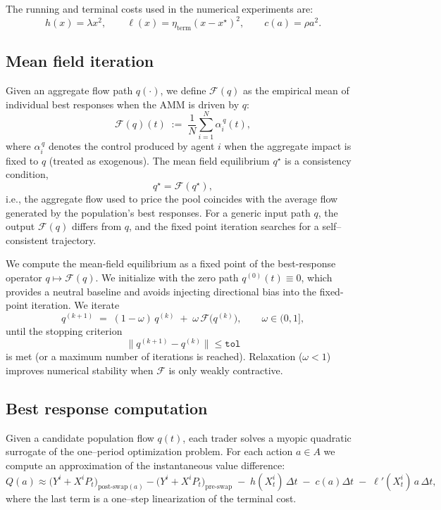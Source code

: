 \documentclass[11pt]{article}
\theoremstyle{definition}
\begin{document}
The running and terminal costs used in the numerical experiments are:
\[
h(x) = \lambda x^2, \qquad
\ell(x) = \eta_{\mathrm{term}}(x - x^\star)^2,
\qquad 
c(a) = \rho a^2.
\]

\subsection*{Mean field iteration}

Given an aggregate flow path $q(\cdot)$, we define $\mathcal{F}(q)$ as the empirical mean of individual best responses when the AMM is driven by $q$:
\[
\mathcal{F}(q)(t)\;:=\;\frac{1}{N}\sum_{i=1}^N \alpha_i^{\,q}(t),
\]
where $\alpha_i^{\,q}$ denotes the control produced by agent $i$ when the aggregate impact is fixed to $q$ (treated as exogenous).
The mean field equilibrium $q^\star$ is a consistency condition,
\[
q^\star=\mathcal{F}(q^\star),
\]
i.e., the aggregate flow used to price the pool coincides with the average flow generated by the population's best responses.
For a generic input path $q$, the output $\mathcal{F}(q)$ differs from $q$, and the fixed point iteration searches for a self--consistent trajectory.

We compute the mean-field equilibrium as a fixed point of the best-response operator
$q \mapsto \mathcal{F}(q)$.
We initialize with the zero path $q^{(0)}(t)\equiv 0$, which provides a neutral baseline and avoids injecting directional bias into the fixed-point iteration. We iterate
\[
q^{(k+1)} \;=\; (1-\omega)\, q^{(k)} \;+\; \omega\, \mathcal{F}\bigl(q^{(k)}\bigr),
\qquad \omega \in (0,1],
\]
until the stopping criterion
\[
\|q^{(k+1)}-q^{(k)}\| \le \texttt{tol}
\]
is met (or a maximum number of iterations is reached).
Relaxation ($\omega<1$) improves numerical stability when $\mathcal{F}$ is only weakly contractive.

\subsection*{Best response computation}
\label{subsec:bestresponse}

Given a candidate population flow $q(t)$, each trader solves a 
myopic quadratic surrogate of the one–period optimization problem.
For each action $a\in A$ we compute an approximation of the
instantaneous value difference:
\[
Q(a) \approx
\big(Y^i + X^i P_t\big)_{\text{post-swap}(a)}
-
\big(Y^i + X^i P_t\big)_{\text{pre-swap}}
\;-\;
h(X^i_t)\,\Delta t
\;-\;
c(a) \Delta t
\;-\;
\ell'(X^i_t)\,a\,\Delta t,
\]
where the last term is a one–step linearization of the terminal cost.
\end{document}
